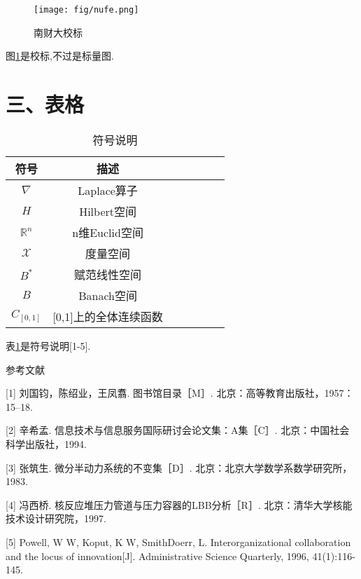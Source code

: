 \documentclass[a4paper]{article}
\newcommand{\cankaowenxian}{\CJKfamily{fsong}\fontsize{10.5pt}{15.75pt}\selectfont}
\newcommand{\biaoge}{\CJKfamily{fsong}\fontsize{10.5pt}{13.125pt}\selectfont}
\newcommand{\biaocaption}[1]{\caption{\hspace{1em}#1}}
\newcommand{\tucaption}[1]{\caption{\hspace{1em}#1}}
\begin{document}
{\begin{figure}[htpb]
    \centering
    \texttt{[image: fig/nufe.png]}
    \tucaption{南财大校标}
    \label{校标}
\end{figure}
图\ref{校标}是校标,不过是标量图.


\section*{三、表格}

{\biaoge
\begin{table}[H]
  \centering  %
  \biaocaption{符号说明}  %
  \label{notion} %
  \begin{tabular}{ccccccc} %
  \toprule  %
  {\bf 符号}  & {\bf 描述}\\[0.2cm]
  \midrule  %

$\nabla$ & Laplace算子 \\[0.2cm]

$H$ & Hilbert空间 \\[0.2cm]

$\mathbb{R}^n$ & n维Euclid空间 \\[0.2cm]

$\mathscr{X}$ & 度量空间 \\[0.2cm]

$B^*$ & 赋范线性空间 \\[0.2cm]

$B$ & Banach空间 \\[0.2cm]

$C_{[0,1]}$ & [0,1]上的全体连续函数 \\[0.2cm]

\bottomrule  %
\end{tabular}
\end{table}
}
表\ref{notion}是符号说明[1-5].


}

\vspace{2em}


{\cankaowenxian

\begin{center}
  {\fontsize{12pt}{28pt}\selectfont 参考文献}
\end{center}

[1] 刘国钧，陈绍业，王凤翥. 图书馆目录［M］. 北京：高等教育出版社，1957：15–18.

[2] 辛希孟. 信息技术与信息服务国际研讨会论文集：A集［C］. 北京：中国社会科学出版社，1994.

[3] 张筑生. 微分半动力系统的不变集［D］. 北京：北京大学数学系数学研究所，1983.

[4] 冯西桥. 核反应堆压力管道与压力容器的LBB分析［R］. 北京：清华大学核能技术设计研究院，1997.

[5] Powell, W W, Koput, K W, SmithDoerr, L. Interorganizational collaboration and the locus of innovation[J]. Administrative Science Quarterly, 1996, 41(1):116-145.

}
\end{document}
